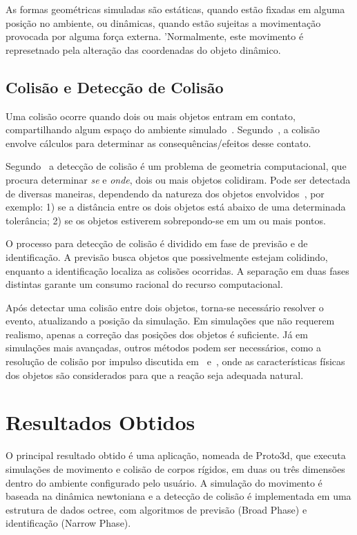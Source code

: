 \documentclass[12pt]{article}
\begin{document}
As formas geométricas simuladas são estáticas, quando estão fixadas em alguma posição no ambiente, ou dinâmicas, quando estão sujeitas a movimentação provocada por alguma força externa. 'Normalmente, este movimento é represetnado pela alteração das coordenadas do objeto dinâmico.

\subsection{Colisão e Detecção de Colisão}

Uma colisão ocorre quando dois ou mais objetos entram em contato, compartilhando algum espaço do ambiente simulado~\cite{ericson2004real}. Segundo~\cite{bourg2013physics}, a colisão envolve cálculos para determinar as consequências/efeitos desse contato.

Segundo~\cite{bourg2013physics} a detecção de colisão é um problema de geometria computacional, que procura determinar \emph{se} e \emph{onde}, dois ou mais objetos colidiram. Pode ser detectada de diversas maneiras, dependendo da natureza dos objetos envolvidos~\cite{foley1996}, por exemplo: 1) se a distância entre os dois objetos está abaixo de uma determinada tolerância; 2) se os objetos estiverem sobrepondo-se em um ou mais pontos.

O processo para detecção de colisão é dividido em fase de previsão e de identificação. A previsão busca objetos que possivelmente estejam colidindo, enquanto a identificação localiza as colisões ocorridas. A separação em duas fases distintas garante um consumo racional do recurso computacional. 

Após detectar uma colisão entre dois objetos, torna-se necessário resolver o evento, atualizando a posição da simulação. Em simulações que não requerem realismo, apenas a correção das posições dos objetos é suficiente. Já em simulações mais avançadas, outros métodos podem ser necessários, como a resolução de colisão por impulso discutida em~\cite{bourg2013physics} e~\cite{baraff1992dynamic}, onde as características físicas dos objetos são considerados para que a reação seja adequada natural.

\section{Resultados Obtidos}
O principal resultado obtido é uma aplicação, nomeada de Proto3d, que executa simulações de movimento e colisão de corpos rígidos, em duas ou três dimensões dentro do ambiente configurado pelo usuário. A simulação do movimento é baseada na dinâmica newtoniana e a detecção de colisão é implementada em uma estrutura de dados octree, com algoritmos de previsão (Broad Phase) e identificação (Narrow Phase).
\end{document}
